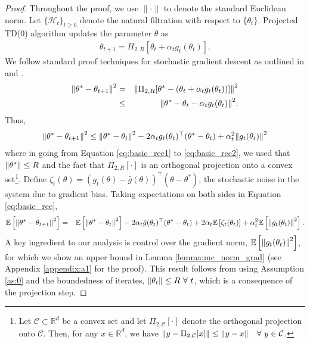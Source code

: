 \documentclass{colt2018} %
\begin{document}
\begin{proof}
Throughout the proof, we use $\| \cdot \|$ to denote the standard Euclidean norm. Let $\{\mathcal{H}_t\}_{t \geq 0}$ denote the natural filtration with respect to $\{\theta_t\}$. Projected TD(0) algorithm updates the parameter $\theta$ as
\begin{eqnarray*}
\theta_{t+1} = \Pi_{2,R} [\theta_t + \alpha_t g_t(\theta_t)].
\end{eqnarray*}
We follow standard proof techniques for stochastic gradient descent as outlined in \cite{lacoste2012simpler} and \cite{nemirovski2009robust}. 
\begin{eqnarray}
\norm{\theta^* - \theta_{t+1}}^2 &=& \norm{ \Pi_{2,R} [\theta^* - (\theta_t + \alpha_t g_t(\theta_t)) ]}^2 \label{eq:basic_rec1}\\
&\leq& \norm{ \theta^* - \theta_t - \alpha_t g_t(\theta_t)}^2. \label{eq:basic_rec2}
\end{eqnarray}
Thus,
\begin{eqnarray}
\norm{\theta^* - \theta_{t+1}}^2 \leq \norm{\theta^* - \theta_t}^2 - 2\alpha_t g_t(\theta_t)^\top (\theta^* - \theta_t) + \alpha_t^2 \norm{g_t(\theta_t)}^2 \label{eq:basic_rec}
\end{eqnarray}
where in going from Equation \eqref{eq:basic_rec1} to \eqref{eq:basic_rec2}, we used that $\norm{\theta^*} \leq R$ and the fact that $\Pi_{2,R}\left[\cdot\right]$ is an orthogonal projection onto a convex set\footnote{Let $\mathcal{C} \subset \mathbb{R}^d$ be a convex set and let $\Pi_{2,\mathcal{C}}[\cdot]$ denote the orthogonal projection onto $\mathcal{C}$. Then, for any $x \in \mathbb{R}^d$, we have $\norm{y - \Pi_{2,\mathcal{C}}[x]} \leq \norm{y - x} \quad \forall \,\, y \in \mathcal{C}$.}. Define $\zeta_t(\theta) = \left(g_t(\theta) - \bar{g}(\theta)\right)^\top(\theta - \theta^*)$, the stochastic noise in the system due to gradient bias. Taking expectations on both sides in Equation \eqref{eq:basic_rec},
\begin{eqnarray*}
\mathbb{E} \left[ \norm{\theta^* - \theta_{t+1}}^2 \right] &=& \mathbb{E} \left[ \norm{\theta^* - \theta_t}^2 \right] - 2\alpha_t \bar{g}(\theta_t)^\top (\theta^* - \theta_t) + 2\alpha_t \mathbb{E}\left[ \zeta_t(\theta_t) \right] + \alpha_t^2 \mathbb{E} \left[ \norm{g_t(\theta_t)}^2 \right]. 
\end{eqnarray*}
A key ingredient to our analysis is control over the gradient norm, $\mathbb{E} \left[ \norm{g_t(\theta_t)}^2 \right]$, for which we show an upper bound in Lemma \ref{lemma:mc_norm_grad} (see Appendix \ref{appendix:a1} for the proof). This result follows from using Assumption \ref{as:0} and the boundedness of iterates, $\norm{\theta_t} \leq R \,\, \forall \,\, t$, which is a consequence of the projection step. 

\end{proof}
\end{document}
